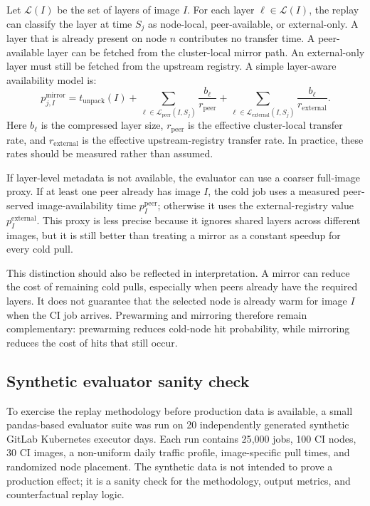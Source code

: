 \documentclass[11pt,a4paper]{article}
\begin{document}
Let \(\mathcal{L}(I)\) be the set of layers of image \(I\). For each layer \(\ell\in\mathcal{L}(I)\), the replay can classify the layer at time \(S_j\) as node-local, peer-available, or external-only. A layer that is already present on node \(n\) contributes no transfer time. A peer-available layer can be fetched from the cluster-local mirror path. An external-only layer must still be fetched from the upstream registry. A simple layer-aware availability model is:
\begin{equation}
  p_{j,I}^{\mathrm{mirror}}
  =
  t_{\mathrm{unpack}}(I)
  +
  \sum_{\ell\in \mathcal{L}_{\mathrm{peer}}(I,S_j)} \frac{b_\ell}{r_{\mathrm{peer}}}
  +
  \sum_{\ell\in \mathcal{L}_{\mathrm{external}}(I,S_j)} \frac{b_\ell}{r_{\mathrm{external}}}.
\end{equation}
Here \(b_\ell\) is the compressed layer size, \(r_{\mathrm{peer}}\) is the effective cluster-local transfer rate, and \(r_{\mathrm{external}}\) is the effective upstream-registry transfer rate. In practice, these rates should be measured rather than assumed.

If layer-level metadata is not available, the evaluator can use a coarser full-image proxy. If at least one peer already has image \(I\), the cold job uses a measured peer-served image-availability time \(p_I^{\mathrm{peer}}\); otherwise it uses the external-registry value \(p_I^{\mathrm{external}}\). This proxy is less precise because it ignores shared layers across different images, but it is still better than treating a mirror as a constant speedup for every cold pull.

This distinction should also be reflected in interpretation. A mirror can reduce the cost of remaining cold pulls, especially when peers already have the required layers. It does not guarantee that the selected node is already warm for image \(I\) when the CI job arrives. Prewarming and mirroring therefore remain complementary: prewarming reduces cold-node hit probability, while mirroring reduces the cost of hits that still occur.

\subsection{Synthetic evaluator sanity check}

To exercise the replay methodology before production data is available, a small pandas-based evaluator suite was run on 20 independently generated synthetic GitLab Kubernetes executor days. Each run contains 25{,}000 jobs, 100 CI nodes, 30 CI images, a non-uniform daily traffic profile, image-specific pull times, and randomized node placement. The synthetic data is not intended to prove a production effect; it is a sanity check for the methodology, output metrics, and counterfactual replay logic.
\end{document}
